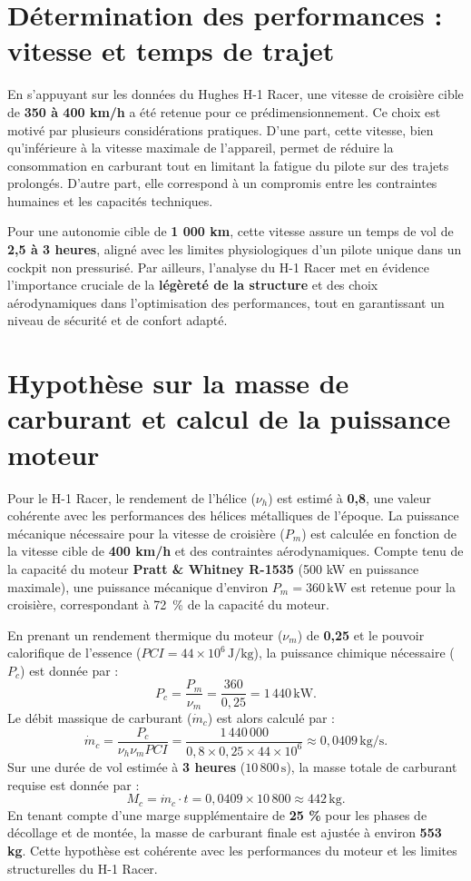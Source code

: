 \documentclass[12pt,a4paper]{article}
\begin{document}
\section{Détermination des performances : vitesse et temps de trajet}

En s’appuyant sur les données du Hughes H-1 Racer, une vitesse de croisière cible de \textbf{350 à 400 km/h} a été retenue pour ce prédimensionnement. Ce choix est motivé par plusieurs considérations pratiques. D’une part, cette vitesse, bien qu’inférieure à la vitesse maximale de l’appareil, permet de réduire la consommation en carburant tout en limitant la fatigue du pilote sur des trajets prolongés. D’autre part, elle correspond à un compromis entre les contraintes humaines et les capacités techniques.

Pour une autonomie cible de \textbf{1 000 km}, cette vitesse assure un temps de vol de \textbf{2,5 à 3 heures}, aligné avec les limites physiologiques d’un pilote unique dans un cockpit non pressurisé. Par ailleurs, l’analyse du H-1 Racer met en évidence l’importance cruciale de la \textbf{légèreté de la structure} et des choix aérodynamiques dans l’optimisation des performances, tout en garantissant un niveau de sécurité et de confort adapté.

\section{Hypothèse sur la masse de carburant et calcul de la puissance moteur}

Pour le H-1 Racer, le rendement de l’hélice ($\nu_h$) est estimé à \textbf{0,8}, une valeur cohérente avec les performances des hélices métalliques de l’époque. La puissance mécanique nécessaire pour la vitesse de croisière ($P_m$) est calculée en fonction de la vitesse cible de \textbf{400 km/h} et des contraintes aérodynamiques. Compte tenu de la capacité du moteur \textbf{Pratt \& Whitney R-1535} (500 kW en puissance maximale), une puissance mécanique d’environ $P_m = 360 \, \text{kW}$ est retenue pour la croisière, correspondant à 72~\% de la capacité du moteur.

En prenant un rendement thermique du moteur ($\nu_m$) de \textbf{0,25} et le pouvoir calorifique de l’essence ($PCI = 44 \times 10^6 \, \text{J/kg}$), la puissance chimique nécessaire ($P_c$) est donnée par :
\[
P_c = \frac{P_m}{\nu_m} = \frac{360}{0,25} = 1\,440 \, \text{kW}.
\]
Le débit massique de carburant ($\dot{m}_c$) est alors calculé par :
\[
\dot{m}_c = \frac{P_c}{\nu_h \nu_m PCI} = \frac{1\,440\,000}{0,8 \times 0,25 \times 44 \times 10^6} \approx 0{,}0409 \, \text{kg/s}.
\]
Sur une durée de vol estimée à \textbf{3 heures} ($10\,800 \, \text{s}$), la masse totale de carburant requise est donnée par :
\[
M_c = \dot{m}_c \cdot t = 0{,}0409 \times 10\,800 \approx 442 \, \text{kg}.
\]
En tenant compte d’une marge supplémentaire de \textbf{25 \%} pour les phases de décollage et de montée, la masse de carburant finale est ajustée à environ \textbf{553 kg}. Cette hypothèse est cohérente avec les performances du moteur et les limites structurelles du H-1 Racer.
\end{document}
